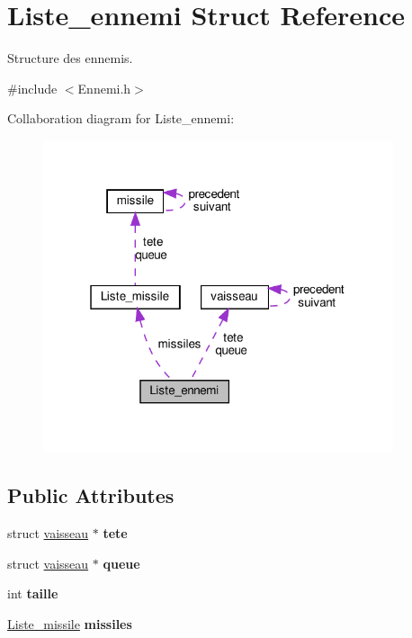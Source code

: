 \hypertarget{struct_liste__ennemi}{}\section{Liste\+\_\+ennemi Struct Reference}
\label{struct_liste__ennemi}


Structure des ennemis.  




{\ttfamily \#include $<$Ennemi.\+h$>$}



Collaboration diagram for Liste\+\_\+ennemi\+:
\nopagebreak
\begin{figure}[H]
\begin{center}
\leavevmode
\includegraphics[width=292pt]{struct_liste__ennemi__coll__graph}
\end{center}
\end{figure}
\subsection*{Public Attributes}
\begin{DoxyCompactItemize}
\item 
\mbox{\label{struct_liste__ennemi_ab39fb0be09a80d78c2c3d47f03be89c0}} 
struct \hyperlink{structvaisseau}{vaisseau} $\ast$ {\bfseries tete}
\item 
\mbox{\label{struct_liste__ennemi_a0790bf27959c8f8831161c018a4786ef}} 
struct \hyperlink{structvaisseau}{vaisseau} $\ast$ {\bfseries queue}
\item 
\mbox{\label{struct_liste__ennemi_a6adf873ff17db461850b65353f6ee253}} 
int {\bfseries taille}
\item 
\mbox{\label{struct_liste__ennemi_a5bbc5d38366ad87ea36b82a30ad3b005}} 
\hyperlink{struct_liste__missile}{Liste\+\_\+missile} {\bfseries missiles}
\end{DoxyCompactItemize}


